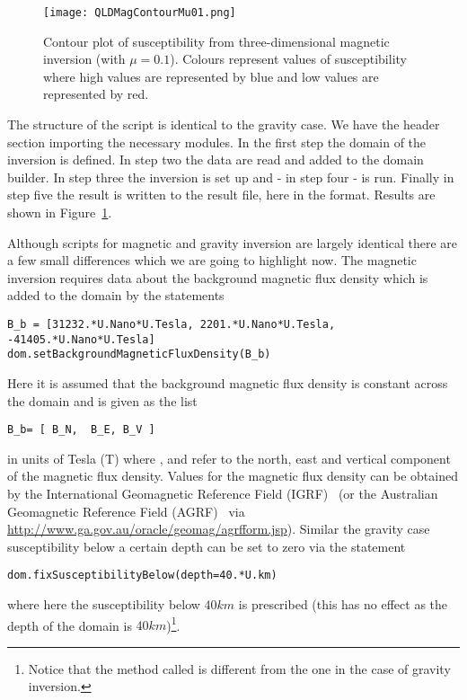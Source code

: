 \begin{figure}
\centering
\texttt{[image: QLDMagContourMu01.png]}
\caption{Contour plot of susceptibility from three-dimensional magnetic inversion (with $\mu=0.1$).
Colours represent values of susceptibility where high values are represented by
    blue and low values are represented by red.}
\label{FIG:P1:MAG:1}
\end{figure}


The structure of the script is identical to the gravity case. We have the header section importing the necessary modules. In the first step
the domain of the inversion is defined. In step two the data are read and added to the domain builder. In step three the inversion is 
set up and - in step four - is run. Finally in step five the result is written to the result file, here  in the \VTK format.
Results are shown in Figure~\ref{FIG:P1:MAG:1}.

Although scripts for magnetic and gravity inversion are largely identical there are a few small differences which we are
going to highlight now. The magnetic inversion requires data about the background  magnetic flux density which is added to the domain
by the statements 
\begin{verbatim}
B_b = [31232.*U.Nano*U.Tesla, 2201.*U.Nano*U.Tesla, -41405.*U.Nano*U.Tesla]
dom.setBackgroundMagneticFluxDensity(B_b)
\end{verbatim}
Here it is assumed that the background magnetic flux density is constant across the domain and is given as the list
\begin{verbatim}
B_b= [ B_N,  B_E, B_V ]
\end{verbatim}
in units of Tesla (T) where 
,  and  refer to 
the north, east and vertical component of the magnetic flux density.
Values for the magnetic flux density can be obtained by the International
Geomagnetic Reference Field (IGRF)~\cite{IGRF} 
(or the Australian Geomagnetic Reference Field (AGRF)~\cite{AGRF} via \url{http://www.ga.gov.au/oracle/geomag/agrfform.jsp}).
Similar the gravity case susceptibility below a certain depth can be set to zero via the statement
\begin{verbatim}
dom.fixSusceptibilityBelow(depth=40.*U.km)
\end{verbatim}
where here the susceptibility below $40km$ is prescribed (this has no effect as the depth of the domain is
$40km$)\footnote{Notice that the method called is different from the one in the case of gravity inversion.}. 


